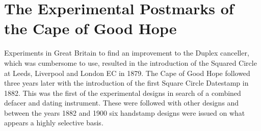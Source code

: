 \chapter{The Experimental Postmarks of the Cape of Good Hope
} 
Experiments in Great Britain to find an improvement to the Duplex canceller, which was cumbersome to use, resulted in the introduction of the Squared Circle at Leeds, Liverpool and London EC in 1879. The Cape of Good Hope followed three years later with the introduction of the first Square Circle Datestamp in 1882. This was the first of the experimental designs in search of a combined defacer and dating instrument. These were followed with other designs and between the years 1882 and 1900 six handstamp designs were issued on what appears a highly selective basis. 

\begin{marginfigure}

\end{marginfigure}
